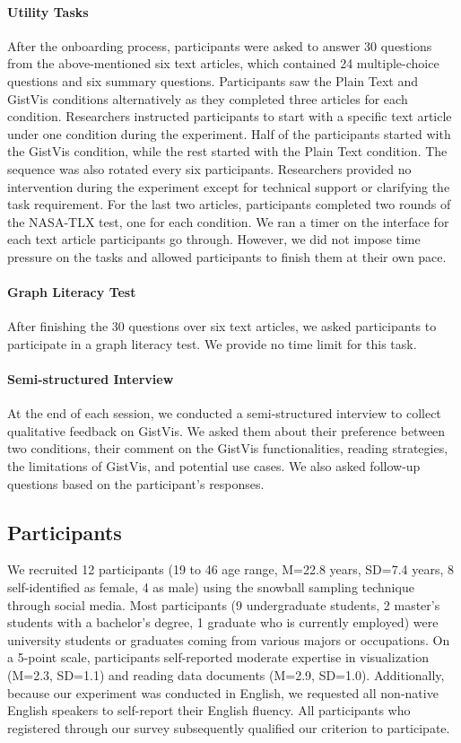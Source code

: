 \paragraph{Utility Tasks}
After the onboarding process, participants were asked to answer 30 questions from the above-mentioned six text articles, which contained 24 multiple-choice questions and six summary questions. Participants saw the Plain Text and GistVis conditions alternatively as they completed three articles for each condition. Researchers instructed participants to start with a specific text article under one condition during the experiment. Half of the participants started with the GistVis condition, while the rest started with the Plain Text condition. The sequence was also rotated every six participants. Researchers provided no intervention during the experiment except for technical support or clarifying the task requirement. For the last two articles, participants completed two rounds of the NASA-TLX test, one for each condition. We ran a timer on the interface for each text article participants go through. However, we did not impose time pressure on the tasks and allowed participants to finish them at their own pace.

\paragraph{Graph Literacy Test}
After finishing the 30 questions over six text articles, we asked participants to participate in a graph literacy test. We provide no time limit for this task.

\paragraph{Semi-structured Interview}
At the end of each session, we conducted a semi-structured interview to collect qualitative feedback on GistVis. We asked them about their preference between two conditions, their comment on the GistVis functionalities, reading strategies, the limitations of GistVis, and potential use cases. We also asked follow-up questions based on the participant's responses.

\subsection{Participants}
We recruited 12 participants (19 to 46 age range, M=22.8 years, SD=7.4 years, 8 self-identified as female, 4 as male) using the snowball sampling technique through social media. Most participants (9 undergraduate students, 2 master's students with a bachelor's degree, 1 graduate who is currently employed) were university students or graduates coming from various majors or occupations. On a 5-point scale, participants self-reported moderate expertise in visualization (M=2.3, SD=1.1) and reading data documents (M=2.9, SD=1.0). Additionally, because our experiment was conducted in English, we requested all non-native English speakers to self-report their English fluency. All participants who registered through our survey subsequently qualified our criterion to participate.

